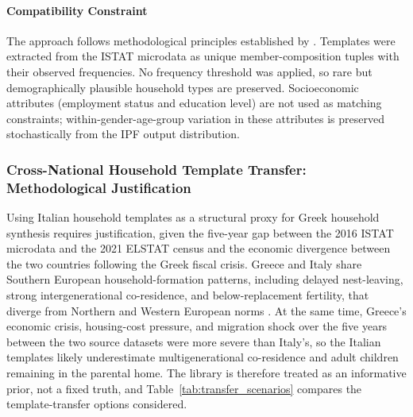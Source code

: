 \documentclass{article}
\begin{document}
\paragraph{Compatibility Constraint}\label{compatibility-function-and-weight-specification}

The approach follows methodological principles established by \citet{lenormand2013generating}. Templates were extracted from the ISTAT microdata as unique member-composition tuples with their observed frequencies. No frequency threshold was applied, so rare but demographically plausible household types are preserved. Socioeconomic attributes (employment status and education level) are not used as matching constraints; within-gender-age-group variation in these attributes is preserved stochastically from the IPF output distribution.

\subsubsection{Cross-National Household Template Transfer: Methodological Justification}\label{cross-national-household-template-transfer-methodological-justification}

Using Italian household templates as a structural proxy for Greek household synthesis requires justification, given the five-year gap between the 2016 ISTAT microdata and the 2021 ELSTAT census and the economic divergence between the two countries following the Greek fiscal crisis. Greece and Italy share Southern European household-formation patterns, including delayed nest-leaving, strong intergenerational co-residence, and below-replacement fertility, that diverge from Northern and Western European norms \citep{Reher1998, Naldini2003, Iacovou2011HouseholdEU}. At the same time, Greece's economic crisis, housing-cost pressure, and migration shock over the five years between the two source datasets were more severe than Italy's, so the Italian templates likely underestimate multigenerational co-residence and adult children remaining in the parental home. The library is therefore treated as an informative prior, not a fixed truth, and Table~\ref{tab:transfer_scenarios} compares the template-transfer options considered.
\end{document}
